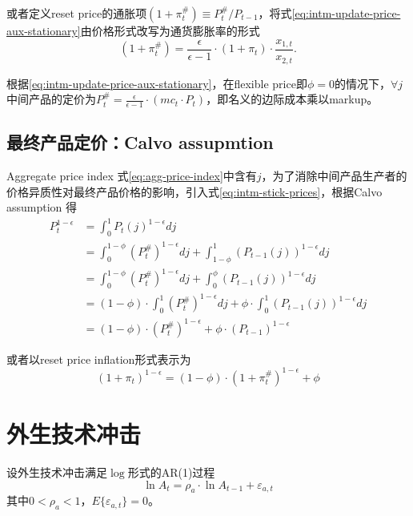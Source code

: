 或者定义reset price的通胀项$(1+ \pi^{\#}_t) \equiv P^{\#}_t / P_{t-1}$，将式\eqref{eq:intm-update-price-aux-stationary}由价格形式改写为通货膨胀率的形式
\begin{equation}
  \label{eq:intm-update-inflation-aux}
  (1+\pi^{\#}_t) = \frac{\epsilon}{\epsilon -1} \cdot \left( 1+\pi_t \right) \cdot \frac{x_{1,t}}{x_{2,t}}.
\end{equation}

根据\eqref{eq:intm-update-price-aux-stationary}，在flexible price即$\phi =0$的情况下，$\forall j$ 中间产品的定价为$P^{\#}_t = \frac{\epsilon}{\epsilon -1} \cdot (mc_t \cdot P_t)$，即名义的边际成本乘以markup。


\subsection{最终产品定价：Calvo assupmtion}
\label{sec:final-produc-price}

Aggregate price index 式\eqref{eq:agg-price-index}中含有$j$，为了消除中间产品生产者的价格异质性对最终产品价格的影响，引入式\eqref{eq:intm-stick-prices}，根据Calvo assumption \citep{Calvo:1983uq}得
\begin{align}
\label{eq:agg-price-index-noj}
  P_t^{1-\epsilon} &= \int_{0}^1 P_t(j)^{1-\epsilon} dj \nonumber\\
                   &= \int_{0}^{1-\phi} \left(P_t^{\#}\right)^{1-\epsilon} dj + \int_{1-\phi}^1 \left(P_{t-1}(j)\right)^{1-\epsilon} dj\nonumber\\
                   &= \int_{0}^{1-\phi} \left(P_t^{\#}\right)^{1-\epsilon} dj + \int_{0}^{\phi} \left(P_{t-1}(j)\right)^{1-\epsilon} dj\nonumber\\
                   &= (1-\phi) \cdot \int_{0}^{1} \left(P_t^{\#}\right)^{1-\epsilon} dj + \phi \cdot \int_{0}^1 \left(P_{t-1}(j)\right)^{1-\epsilon} dj \nonumber\\
                   &=(1-\phi) \cdot \left(P^{\#}_t\right)^{1-\epsilon} + \phi \cdot \left(P_{t-1}\right)^{1-\epsilon}
\end{align}

或者以reset price inflation形式表示为
\begin{equation}
  \label{eq:agg-inflation-index}
  \left(1+\pi_t\right)^{1-\epsilon} = (1-\phi) \cdot \left(1+\pi^{\#}_t\right)^{1-\epsilon} + \phi
\end{equation}

\section{外生技术冲击}
\label{sec:exo-prod-shock}
设外生技术冲击满足$\log$形式的AR(1)过程
\begin{equation}
  \label{eq:exo-prod-shock}
  \ln A_t = \rho_a \cdot \ln A_{t-1} + \varepsilon_{a,t}
\end{equation}
其中$0<\rho_a<1$，$E\{\varepsilon_{a,t}\}=0$。

